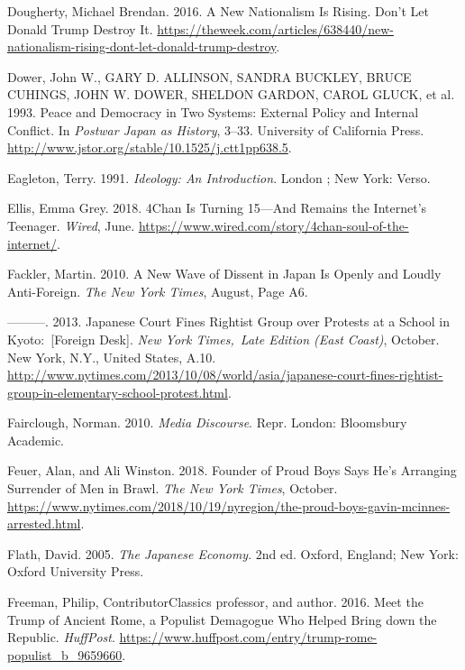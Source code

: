 \documentclass[10pt,british,A4paper,,openany]{memoir}
\begin{document}
\hypertarget{ref-dougherty_new_2016}{}
Dougherty, Michael Brendan. 2016. A New Nationalism Is Rising. Don't Let
Donald Trump Destroy It.
\url{https://theweek.com/articles/638440/new-nationalism-rising-dont-let-donald-trump-destroy}.

\hypertarget{ref-dower_peace_1993}{}
Dower, John W., GARY D. ALLINSON, SANDRA BUCKLEY, BRUCE CUHINGS, JOHN W.
DOWER, SHELDON GARDON, CAROL GLUCK, et al. 1993. Peace and Democracy in
Two Systems: External Policy and Internal Conflict. In \emph{Postwar
Japan as History}, 3--33. University of California Press.
\url{http://www.jstor.org/stable/10.1525/j.ctt1pp638.5}.

\hypertarget{ref-eagleton_ideology:_1991}{}
Eagleton, Terry. 1991. \emph{Ideology: An Introduction}. London ; New
York: Verso.

\hypertarget{ref-ellis_4chan_2018}{}
Ellis, Emma Grey. 2018. 4Chan Is Turning 15---And Remains the Internet's
Teenager. \emph{Wired}, June.
\url{https://www.wired.com/story/4chan-soul-of-the-internet/}.

\hypertarget{ref-fackler_new_2010-1}{}
Fackler, Martin. 2010. A New Wave of Dissent in Japan Is Openly and
Loudly Anti-Foreign. \emph{The New York Times}, August, Page A6.

\hypertarget{ref-fackler_japanese_2013}{}
---------. 2013. Japanese Court Fines Rightist Group over Protests at a
School in Kyoto:~{[}Foreign Desk{]}. \emph{New York Times,~Late Edition
(East Coast)}, October. New York, N.Y., United States, A.10.
\url{http://www.nytimes.com/2013/10/08/world/asia/japanese-court-fines-rightist-group-in-elementary-school-protest.html}.

\hypertarget{ref-fairclough_media_2010}{}
Fairclough, Norman. 2010. \emph{Media Discourse}. Repr. London:
Bloomsbury Academic.

\hypertarget{ref-feuer_founder_2018}{}
Feuer, Alan, and Ali Winston. 2018. Founder of Proud Boys Says He's
Arranging Surrender of Men in Brawl. \emph{The New York Times}, October.
\url{https://www.nytimes.com/2018/10/19/nyregion/the-proud-boys-gavin-mcinnes-arrested.html}.

\hypertarget{ref-flath_japanese_2005}{}
Flath, David. 2005. \emph{The Japanese Economy}. 2nd ed. Oxford,
England; New York: Oxford University Press.

\hypertarget{ref-freeman_meet_2016}{}
Freeman, Philip, ContributorClassics professor, and author. 2016. Meet
the Trump of Ancient Rome, a Populist Demagogue Who Helped Bring down
the Republic. \emph{HuffPost}.
\url{https://www.huffpost.com/entry/trump-rome-populist_b_9659660}.
\end{document}
